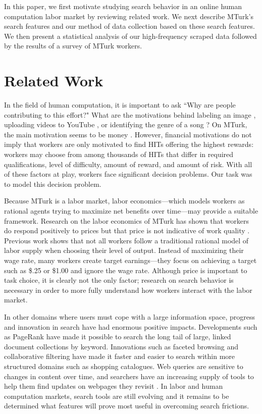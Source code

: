 \documentclass{sig-alternate}
\begin{document}
In this paper, we first motivate studying search behavior in an online
human computation labor market by reviewing related work.  We next
describe MTurk's search features and our method of data collection
based on these search features.  We then present a statistical
analysis of our high-frequency scraped data followed by the results of a survey of MTurk workers.

\section{Related Work} 
In the field of human computation, it is important to ask ``Why are
people contributing to this effort?"  What are the motivations behind
labeling an image \cite{von2004labeling}, uploading videos to YouTube \cite{huberman-crowdsourcing}, or identifying the genre of a song
\cite{law2003tagatune}?  On MTurk, the main motivation seems to be
money \cite{ipeirotis2010,hortonZeck2010}.  However, financial
motivations do not imply that workers are only motivated to find HITs offering the highest rewards: workers may choose from among thousands of HITs that differ in required qualifications, level of difficulty, amount of reward, and
amount of risk. With all of these factors at play, workers face significant
decision problems.  Our task was to model this decision problem.

Because MTurk is a labor market, labor economics---which models
workers as rational agents trying to maximize net benefits over
time---may provide a suitable framework.  Research on the labor economics
of MTurk has shown that workers do respond positively to prices but
that price is not indicative of work quality \cite{mason2009fip}.  Previous work \cite{horton2010labor} shows
that not all workers follow a traditional rational model of labor
supply when choosing their level of output.  Instead of maximizing
their wage rate, many workers create target earnings---they focus on
achieving a target such as \$.25 or \$1.00 and ignore the wage rate.  Although price is important to task choice, it is clearly not the only
factor; research on
search behavior is necessary in order to more fully understand how workers interact with the labor market.

In other domains where users must cope with a large information space,
progress and innovation in search have had enormous positive impacts.
Developments such as Page\-Rank \cite{brin1998pagerank} have made it possible to search the long tail of large, linked document collections by keyword.  Innovations such as faceted browsing \cite{hearst2002finding} and collaborative filtering \cite{goldbergInformationTapestry} have made it faster and easier to search within more structured domains such as shopping catalogues.   Web queries are sensitive to changes in content over time,
and searchers have an increasing supply of tools to help them find updates on webpages they revisit \cite{adar2008zoetrope}.  In labor and human computation markets, search tools are still evolving and it remains to be determined what features will prove most useful in overcoming search frictions.
\end{document}
